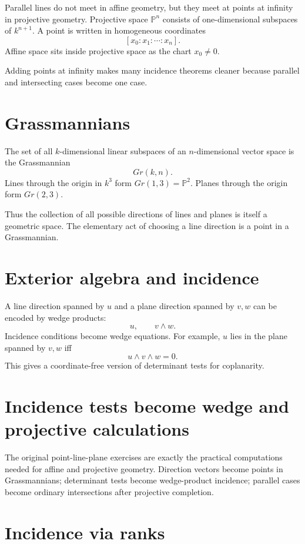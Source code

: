 Parallel lines do not meet in affine geometry, but they meet at points at infinity in projective geometry.  Projective space $\mathbb P^n$ consists of one-dimensional subspaces of $k^{n+1}$.  A point is written in homogeneous coordinates
\[
  [x_0:x_1:\cdots:x_n].
\]
Affine space sits inside projective space as the chart $x_0\ne0$.

Adding points at infinity makes many incidence theorems cleaner because parallel and intersecting cases become one case.

\section{Grassmannians}

The set of all $k$-dimensional linear subspaces of an $n$-dimensional vector space is the Grassmannian
\[
  Gr(k,n).
\]
Lines through the origin in $k^3$ form $Gr(1,3)=\mathbb P^2$.  Planes through the origin form $Gr(2,3)$.

Thus the collection of all possible directions of lines and planes is itself a geometric space.  The elementary act of choosing a line direction is a point in a Grassmannian.

\section{Exterior algebra and incidence}

A line direction spanned by $u$ and a plane direction spanned by $v,w$ can be encoded by wedge products:
\[
  u,\qquad v\wedge w.
\]
Incidence conditions become wedge equations.  For example, $u$ lies in the plane spanned by $v,w$ iff
\[
  u\wedge v\wedge w=0.
\]
This gives a coordinate-free version of determinant tests for coplanarity.

\section{Incidence tests become wedge and projective calculations}

The original point-line-plane exercises are exactly the practical computations needed for affine and projective geometry.  Direction vectors become points in Grassmannians; determinant tests become wedge-product incidence; parallel cases become ordinary intersections after projective completion.

\section{Incidence via ranks}

